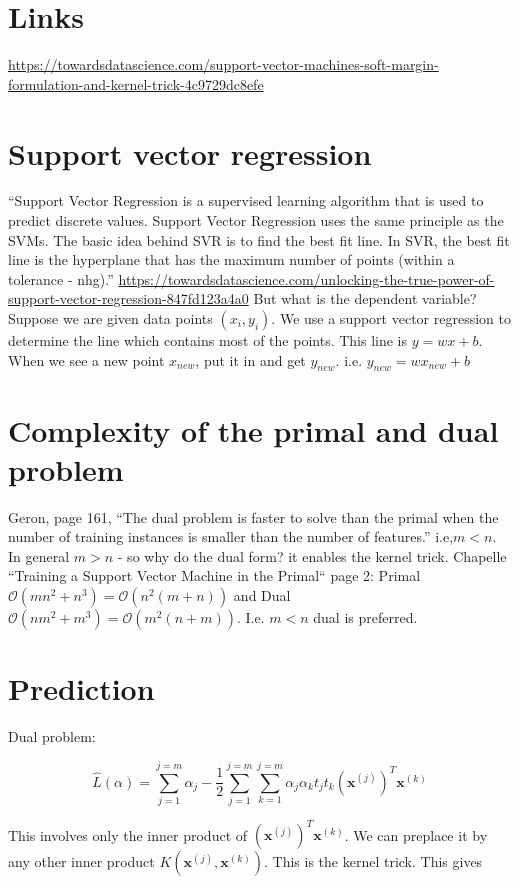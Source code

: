 \documentclass{article}
\newcommand{\beq}{\begin{equation}}
\newcommand{\eeq}{\end{equation}}
\begin{document}
\section{Links}
\url{https://towardsdatascience.com/support-vector-machines-soft-margin-formulation-and-kernel-trick-4c9729dc8efe}

\section{Support vector regression}
``Support Vector Regression is a supervised learning algorithm that is used to predict discrete values. Support Vector Regression uses the same principle as the SVMs. The basic idea behind SVR is to find the best fit line. In SVR, the best fit line is the hyperplane that has the maximum number of points (within a tolerance - nhg).'' \url{https://towardsdatascience.com/unlocking-the-true-power-of-support-vector-regression-847fd123a4a0} But what is the dependent variable? Suppose we are given data points $(x_i,y_i)$. We use a support vector regression to determine the line which contains most of the points. This line is $y=wx+b$. When we see a new point $x_{new}$, put it in and get $y_{new}$. i.e. $y_{new} = wx_{new}+b$

\section{Complexity of the primal and dual problem}
Geron, page 161, ``The dual problem is faster to solve than the primal when the number of training instances is smaller than the number of features.'' i.e,$m<n$. In general $m>n$ - so why do the dual form? it enables the kernel trick.
Chapelle ``Training a Support Vector Machine in the Primal`` page 2: Primal $\mathcal{O}(mn^2 + n^3)=\mathcal{O}(n^2(m+n))$ and Dual $\mathcal{O}(nm^2+m^3)=\mathcal{O}(m^2(n+m))$. I.e. $m<n$ dual is preferred.  


\section{Prediction}

Dual problem:

\beq
\hat{L}(\alpha) = \sum_{j=1}^{j=m}\alpha_j - \frac{1}{2}\sum_{j=1}^{j=m}\sum_{k=1}^{j=m}\alpha_j\alpha_kt_jt_k(\pmb{x}^{(j)})^T\pmb{x}^{(k)}
\eeq

This involves only the inner product of $(\pmb{x}^{(j)})^T\pmb{x}^{(k)}$. We can preplace it by any other inner product $K(\pmb{x}^{(j)},\pmb{x}^{(k)})$. This is the kernel trick. This gives
\end{document}
